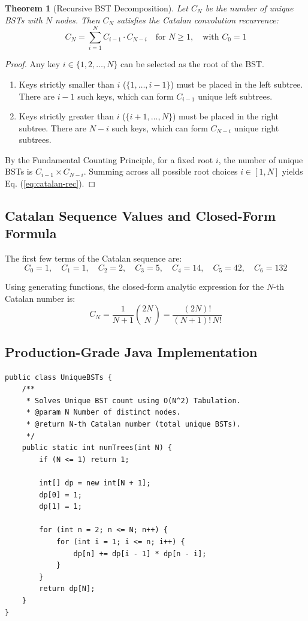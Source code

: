\documentclass[10pt,journal,compsoc,onecolumn]{IEEEtran}
\newtheorem{theorem}{Theorem}
\begin{document}
\begin{theorem}[Recursive BST Decomposition]
Let $C_N$ be the number of unique BSTs with $N$ nodes. Then $C_N$ satisfies the Catalan convolution recurrence:
\begin{equation}
C_N = \sum_{i=1}^{N} C_{i-1} \cdot C_{N-i} \quad \text{for } N \ge 1, \quad \text{with } C_0 = 1
\label{eq:catalan-rec}
\end{equation}
\end{theorem}

\begin{proof}
Any key $i \in \{1, 2, \dots, N\}$ can be selected as the root of the BST.
\begin{enumerate}
    \item Keys strictly smaller than $i$ ($\{1, \dots, i-1\}$) must be placed in the left subtree. There are $i-1$ such keys, which can form $C_{i-1}$ unique left subtrees.
    \item Keys strictly greater than $i$ ($\{i+1, \dots, N\}$) must be placed in the right subtree. There are $N-i$ such keys, which can form $C_{N-i}$ unique right subtrees.
\end{enumerate}
By the Fundamental Counting Principle, for a fixed root $i$, the number of unique BSTs is $C_{i-1} \times C_{N-i}$. Summing across all possible root choices $i \in [1, N]$ yields Eq. (\ref{eq:catalan-rec}).
\end{proof}

\subsection{Catalan Sequence Values and Closed-Form Formula}

The first few terms of the Catalan sequence are:
\[
C_0 = 1, \quad C_1 = 1, \quad C_2 = 2, \quad C_3 = 5, \quad C_4 = 14, \quad C_5 = 42, \quad C_6 = 132
\]

Using generating functions, the closed-form analytic expression for the $N$-th Catalan number is:
\begin{equation}
C_N = \frac{1}{N+1} \binom{2N}{N} = \frac{(2N)!}{(N+1)! \, N!}
\label{eq:catalan-closed-form}
\end{equation}

\subsection{Production-Grade Java Implementation}

\begin{verbatim}
public class UniqueBSTs {
    /**
     * Solves Unique BST count using O(N^2) Tabulation.
     * @param N Number of distinct nodes.
     * @return N-th Catalan number (total unique BSTs).
     */
    public static int numTrees(int N) {
        if (N <= 1) return 1;

        int[] dp = new int[N + 1];
        dp[0] = 1;
        dp[1] = 1;

        for (int n = 2; n <= N; n++) {
            for (int i = 1; i <= n; i++) {
                dp[n] += dp[i - 1] * dp[n - i];
            }
        }
        return dp[N];
    }
}
\end{verbatim}
\end{document}
